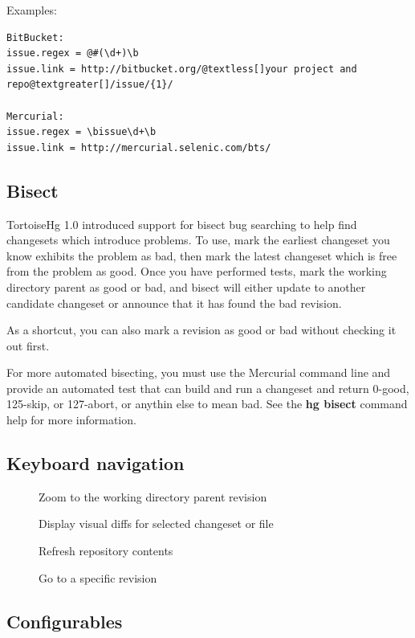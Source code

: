 \documentclass[letterpaper,10pt,english]{manual}
\begin{document}
Examples:

\begin{Verbatim}[commandchars=@\[\]]
BitBucket:
issue.regex = @#(\d+)\b
issue.link = http://bitbucket.org/@textless[]your project and repo@textgreater[]/issue/{1}/

Mercurial:
issue.regex = \bissue\d+\b
issue.link = http://mercurial.selenic.com/bts/
\end{Verbatim}


\subsection{Bisect}

TortoiseHg 1.0 introduced support for bisect bug searching to help find
changesets which introduce problems. To use, mark the earliest changeset
you know exhibits the problem as bad, then mark the latest changeset
which is free from the problem as good.  Once you have performed tests,
mark the working directory parent as good or bad, and bisect will either
update to another candidate changeset or announce that it has found the
bad revision.

As a shortcut, you can also mark a revision as good or bad without
checking it out first.

For more automated bisecting, you must use the Mercurial command line
and provide an automated test that can build and run a changeset and
return 0-good, 125-skip, or 127-abort, or anythin else to mean bad.  See
the \textbf{hg bisect} command help for more information.


\subsection{Keyboard navigation}
\begin{description}
\item[]
Zoom to the working directory parent revision

\item[]
Display visual diffs for selected changeset or file

\item[]
Refresh repository contents

\item[]
Go to a specific revision

\end{description}


\subsection{Configurables}
\end{document}
